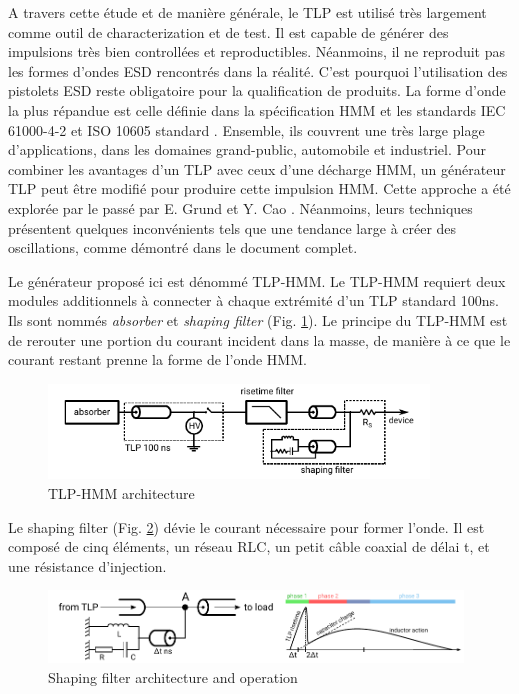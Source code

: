 A travers cette étude et de manière générale, le TLP est utilisé très largement comme outil de characterization et de test.
Il est capable de générer des impulsions très bien controllées et reproductibles.
Néanmoins, il ne reproduit pas les formes d'ondes ESD rencontrés dans la réalité.
C'est pourquoi l'utilisation des pistolets ESD reste obligatoire pour la qualification de produits.
La forme d'onde la plus répandue est celle définie dans la spécification HMM \cite{hmm} et les standards IEC 61000-4-2 \cite{iec61000-4-2} et ISO 10605 standard \cite{iso10605}.
Ensemble, ils couvrent une très large plage d'applications, dans les domaines grand-public, automobile et industriel.
Pour combiner les avantages d'un TLP avec ceux d'une décharge HMM, un générateur TLP peut être modifié pour produire cette impulsion HMM.
Cette approche a été explorée par le passé par E. Grund \cite{iec61000-tlp} et Y. Cao \cite{tlp-based-hmm}.
Néanmoins, leurs techniques présentent quelques inconvénients tels que une tendance large à créer des oscillations, comme démontré dans le document complet.

Le générateur proposé ici est dénommé TLP-HMM.
Le TLP-HMM requiert deux modules additionnels à connecter à chaque extrémité d'un TLP standard 100ns.
Ils sont nommés \textit{absorber} et \textit{shaping filter} (Fig. \ref{fig:tlp_hmm_architecture}).
Le principe du TLP-HMM est de rerouter une portion du courant incident dans la masse, de manière à ce que le courant restant prenne la forme de l'onde HMM.

\begin{figure}[!h]
  \centering
  \includegraphics[width=0.9\textwidth]{src/1/figures/beges_tlp_hmm.pdf}
  \caption{TLP-HMM architecture}
  \label{fig:tlp_hmm_architecture}
\end{figure}

Le shaping filter (Fig. \ref{fig:shaping_filter_example}) dévie le courant nécessaire pour former l'onde.
Il est composé de cinq éléments, un réseau RLC, un petit câble coaxial de délai \textDelta{}t, et une résistance d'injection.

\begin{figure}[!h]
  \centering
  \includegraphics[width=0.98\textwidth]{src/1/figures/example_tlp_hmm.pdf}
  \caption{Shaping filter architecture and operation}
  \label{fig:shaping_filter_example}
\end{figure}

